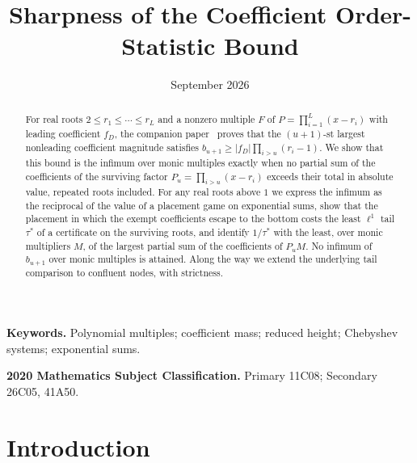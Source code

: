 \documentclass[11pt]{article}
\title{Sharpness of the Coefficient Order-Statistic Bound}
\author{\shortstack{Bangyen Pham\\
\small Independent Researcher\\
\small\href{mailto:bangyenp@gmail.com}{\texttt{bangyenp@gmail.com}}\\
\small\href{https://orcid.org/0009-0006-9928-2088}{ORCID: 0009-0006-9928-2088}}}
\date{September 2026}
\theoremstyle{definition}
\theoremstyle{plain}
\begin{document}
\maketitle

\begin{abstract}
For real roots $2\le r_1\le\cdots\le r_L$ and a nonzero multiple $F$ of
$P=\prod_{i=1}^L(x-r_i)$ with leading coefficient $f_D$, the companion
paper~\cite{coefficient-mass} proves that the $(u+1)$-st largest nonleading
coefficient magnitude satisfies $b_{u+1}\ge|f_D|\prod_{i>u}(r_i-1)$.  We show
that this bound is the infimum over monic multiples exactly when no partial
sum of the coefficients of the surviving factor $P_u=\prod_{i>u}(x-r_i)$
exceeds their total in absolute value, repeated roots included.  For any
real roots above $1$ we express the infimum as the reciprocal of the value
of a placement game on exponential sums, show that the placement in which
the exempt coefficients escape to the bottom costs the least $\ell^1$ tail
$\tau^*$ of a certificate on the surviving roots, and identify $1/\tau^*$
with the least, over monic multipliers $M$, of the largest partial sum of
the coefficients of $P_uM$.  No infimum of $b_{u+1}$ over monic multiples is
attained.  Along the way we extend the underlying tail comparison to
confluent nodes, with strictness.
\end{abstract}

\noindent\textbf{Keywords.} Polynomial multiples; coefficient mass; reduced
height; Chebyshev systems; exponential sums.

\noindent\textbf{2020 Mathematics Subject Classification.} Primary 11C08; Secondary 26C05, 41A50.

\section{Introduction}
\end{document}
